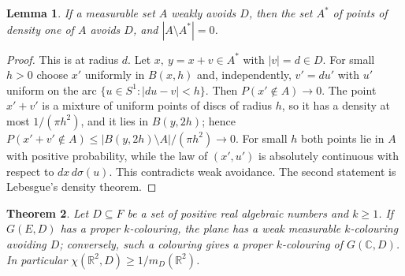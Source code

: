 \documentclass[11pt,a4paper]{amsart}
\newtheorem{theorem}{Theorem}
\newtheorem{lemma}[theorem]{Lemma}
\theoremstyle{definition}
\theoremstyle{remark}
\newcommand{\C}{\mathbb{C}}
\newcommand{\R}{\mathbb{R}}
\begin{document}
\begin{lemma}\label{lem:density}
If a measurable set $A$ weakly avoids $D$, then the set $A^*$ of points of density one of $A$ avoids $D$, and
$|A\setminus A^*|=0$.
\end{lemma}

\begin{proof}
This is \cite[Lemma~4.3]{OpenAI} at radius $d$. Let $x,\ y=x+v\in A^*$ with $|v|=d\in D$. For small $h>0$ choose
$x'$ uniformly in $B(x,h)$ and, independently, $v'=du'$ with $u'$ uniform on the arc $\{u\in S^1:|du-v|<h\}$. Then
$P(x'\notin A)\to0$. The point $x'+v'$ is a mixture of uniform points of discs of radius $h$, so it has a density at
most $1/(\pi h^2)$, and it lies in $B(y,2h)$; hence $P(x'+v'\notin A)\le|B(y,2h)\setminus A|/(\pi h^2)\to0$. For
small $h$ both points lie in $A$ with positive probability, while the law of $(x',u')$ is absolutely continuous with
respect to $dx\,d\sigma(u)$. This contradicts weak avoidance. The second statement is Lebesgue's density theorem.
\end{proof}

\begin{theorem}\label{thm:A}
Let $D\subseteq F$ be a set of positive real algebraic numbers and $k\ge1$. If $G(E,D)$ has a proper $k$-colouring,
the plane has a weak measurable $k$-colouring avoiding $D$; conversely, such a colouring gives a proper
$k$-colouring of $G(\C,D)$. In particular $\chi(\R^2,D)\ge 1/m_D(\R^2)$.
\end{theorem}
\end{document}
